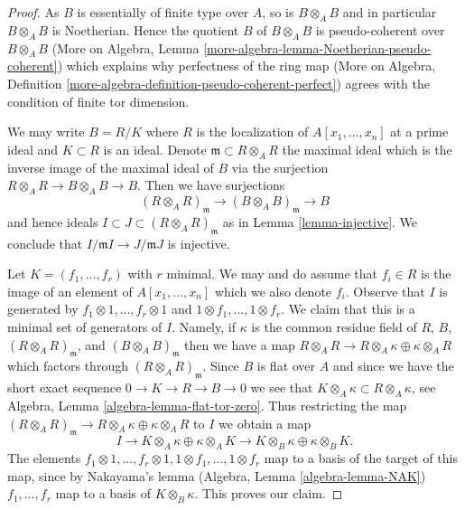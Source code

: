 \documentclass{stacks-project}
\theoremstyle{plain}
\theoremstyle{definition}
\theoremstyle{remark}
\numberwithin{equation}{subsection}
\begin{document}
\begin{proof}
As $B$ is essentially of finite type over $A$, so is $B \otimes_A B$ and
in particular $B \otimes_A B$ is Noetherian. Hence the quotient $B$ of
$B \otimes_A B$ is pseudo-coherent over $B \otimes_A B$
(More on Algebra, Lemma \ref{more-algebra-lemma-Noetherian-pseudo-coherent})
which explains why perfectness of the ring map (More on Algebra, Definition
\ref{more-algebra-definition-pseudo-coherent-perfect}) agrees with the
condition of finite tor dimension.

\medskip\noindent
We may write $B = R/K$ where $R$ is the localization of $A[x_1, \ldots, x_n]$
at a prime ideal and $K \subset R$ is an ideal. Denote
$\mathfrak m \subset R \otimes_A R$ the maximal ideal which is the inverse
image of the maximal ideal of $B$ via the surjection
$R \otimes_A R \to B \otimes_A B \to B$. Then we have surjections
$$
(R \otimes_A R)_\mathfrak m \to (B \otimes_A B)_\mathfrak m \to B
$$
and hence ideals $I \subset J \subset (R \otimes_A R)_\mathfrak m$
as in Lemma \ref{lemma-injective}. We conclude that
$I/\mathfrak m I \to J/\mathfrak m J$ is injective.

\medskip\noindent
Let $K = (f_1, \ldots, f_r)$ with $r$ minimal. We may and do assume that
$f_i \in R$ is the image of an element of $A[x_1, \ldots, x_n]$ which we
also denote $f_i$. Observe that $I$ is generated
by $f_1 \otimes 1, \ldots, f_r \otimes 1$ and
$1 \otimes f_1, \ldots, 1 \otimes f_r$. We claim that this is a minimal
set of generators of $I$. Namely, if $\kappa$ is the common residue field
of $R$, $B$, $(R \otimes_A R)_\mathfrak m$, and $(B \otimes_A B)_\mathfrak m$
then we have a map
$R \otimes_A R \to R \otimes_A \kappa \oplus \kappa \otimes_A R$
which factors through $(R \otimes_A R)_\mathfrak m$. Since $B$ is
flat over $A$ and since we have the short exact sequence
$0 \to K \to R \to B \to 0$ we see that
$K \otimes_A \kappa \subset R \otimes_A \kappa$, see
Algebra, Lemma \ref{algebra-lemma-flat-tor-zero}.
Thus restricting the map
$(R \otimes_A R)_\mathfrak m \to R \otimes_A \kappa \oplus \kappa \otimes_A R$
to $I$ we obtain a map
$$
I \to K \otimes_A \kappa \oplus \kappa \otimes_A K \to
K \otimes_B \kappa \oplus \kappa \otimes_B K.
$$
The elements
$f_1 \otimes 1, \ldots, f_r \otimes 1, 1 \otimes f_1, \ldots, 1 \otimes f_r$
map to a basis of the target of this map, since by Nakayama's lemma
(Algebra, Lemma \ref{algebra-lemma-NAK})
$f_1, \ldots, f_r$ map to a basis of $K \otimes_B \kappa$.
This proves our claim.


\end{proof}
\end{document}
